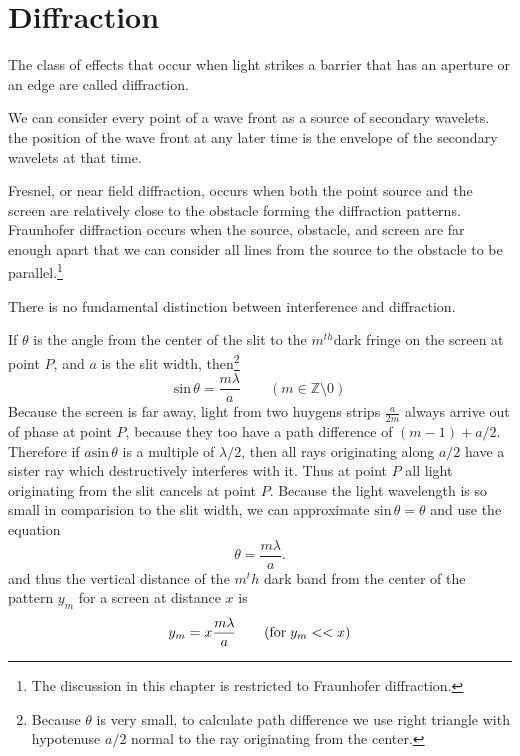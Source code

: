 \documentclass[nobib,notoc]{tufte-handout}
\begin{document}
\section{Diffraction}
\begin{defi}[Diffraction]
	The class of effects that occur when light strikes a barrier that has an aperture or an edge are called diffraction.
\end{defi}
\begin{defi}
	We can consider every point of a wave front as a source of secondary wavelets. the position of the wave front at any later time is the envelope of the secondary wavelets at that time.
\end{defi}
\begin{defi}
	Fresnel, or near field diffraction, occurs when both the point source and the screen are relatively close to the obstacle forming the diffraction patterns. Fraunhofer diffraction occurs when the source, obstacle, and screen are far enough apart that we can consider all lines from the source to the obstacle to be parallel.\footnote{The discussion in this chapter is restricted to Fraunhofer diffraction.}
\end{defi}
\begin{rema}
	There is no fundamental distinction between interference and diffraction.
\end{rema}
\begin{defi}
	If \(\theta\) is the angle from the center of the slit to the \(m^{th}\)dark fringe on the screen at point \(P\), and \(a\) is the slit width, then\footnote{Because \(\theta\) is very small, to calculate path difference we use right triangle with hypotenuse \(a/2\) normal to the ray originating from the center.}
	\begin{equation*}
		\text{sin}\,\theta=\frac{m\lambda}{a}\qquad(m\in\mathbb{Z}\setminus 0)
	\end{equation*}
	Because the screen is far away, light from two huygens strips \(\frac{a}{2m}\) always arrive out of phase at point \(P\), because they too have a path difference of \((m-1)+a/2\). Therefore if \(a\text{sin}\,\theta\) is a multiple of \(\lambda/2\), then all rays originating along \(a/2\) have a sister ray which destructively interferes with it. Thus at point \(P\) all light originating from the slit cancels at point \(P\). Because the light wavelength is so small in comparision to the slit width, we can approximate \(\text{sin}\,\theta=\theta\) and use the equation
	\begin{equation*}
		\theta=\frac{m\lambda}{a}.
	\end{equation*}
	and thus the vertical distance of the \(m^th\) dark band from the center of the pattern \(y_m\) for a screen at distance \(x\) is
	\begin{equation*}
		y_m=x\frac{m\lambda}{a}\qquad(\text{for\;}y_m<<x)
	\end{equation*}
\end{defi}
\end{document}
